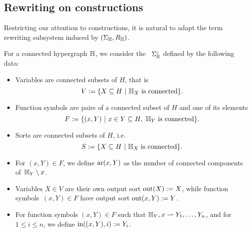




\subsection{Rewriting on constructions}

Restricting our attention to constructions, it is natural to adapt the term rewriting subsystem induced by $(\Sigma_{\mathbb H},R_{\mathbb H})$.

\begin{definition}
  For a connected hypergraph ${\mathbb H}$, we consider the ~$\Sigma_{\mathbb H}^c$ defined by the following data:
  \begin{itemize}
    \item Variables are connected subsets of $H$, that is $$V:=\{ X \subseteq H \ | \ \hyper{H}_{X} \text{ is connected}\}.$$ 
    \item Function symbols are pairs of a connected subset of $H$ and one of its elements 
    $$F:=\{(x,Y) \ | \ x \in Y \subseteq H, \ {\mathbb H}_Y \text{ is connected}\}.$$
    \item Sorts are connected subsets of $H$, i.e. 
    $$S:=\{ X \subseteq H \ | \ {\mathbb H}_X \text{ is connected}\}.$$
    \item For $(x,Y) \in F$, we define $\mathrm{ar}(x,Y)$ as the number of connected components of~${\mathbb H}_Y\setminus {x}$.
    \item Variables $X \in V$ are their own output sort $\operatorname{out}(X):=X$, while function symbols~$(x,Y) \in F$ have output sort $\operatorname{out}(x,Y):=Y$.
    \item For function symbols $(x,Y) \in F$ such that ${\mathbb H}_Y,x \leadsto Y_1,\ldots,Y_n$, and for $1 \leq i \leq n$, we define $\operatorname{in}((x,Y),i):=Y_i$.
  \end{itemize}
\end{definition}

